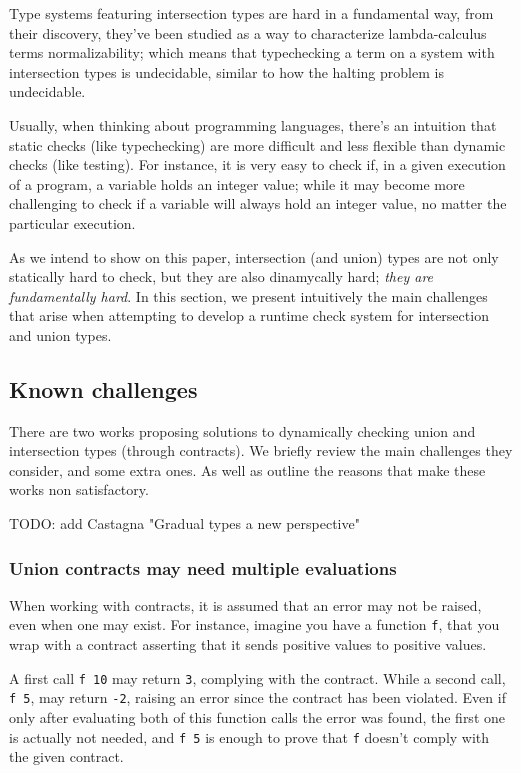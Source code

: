 Type systems featuring intersection types are hard in a fundamental way,
from their discovery, they've been studied as a way to characterize
lambda-calculus terms normalizability; which means that typechecking a
term on a system with intersection types is undecidable,
similar to how the halting problem is undecidable.

Usually, when thinking about programming languages, there's an intuition
that static checks (like typechecking) are more difficult and less flexible
than dynamic checks (like testing). For instance, it is very easy to check if,
in a given execution of a program, a variable holds an integer value; while it
may become more challenging to check if a variable will always hold an integer value,
no matter the particular execution.

As we intend to show on this paper, intersection (and union) types are not only
statically hard to check, but they are also dinamycally hard;
\textit{they are fundamentally hard}.
In this section, we present intuitively the main challenges that arise
when attempting to develop a runtime check system for intersection and
union types.

\subsection{Known challenges}

There are two works proposing solutions to dynamically checking union and intersection
types (through contracts). 
We briefly review the main challenges they consider, and some extra ones.
As well as outline the reasons that make these works non satisfactory.

TODO: add Castagna "Gradual types a new perspective"

\subsubsection*{Union contracts may need multiple evaluations}

When working with contracts, it is assumed that an error may not be raised, even
when one may exist. For instance, imagine you have a function \texttt{f}, that
you wrap with a contract asserting that it sends positive values to positive values.

A first call \texttt{f 10} may return \texttt{3}, complying with the contract.
While a second call, \texttt{f 5}, may return \texttt{-2}, raising an error since
the contract has been violated. Even if only after evaluating both of this function calls
the error was found, the first one is actually not needed, and \texttt{f 5} is enough to
prove that \texttt{f} doesn't comply with the given contract.

